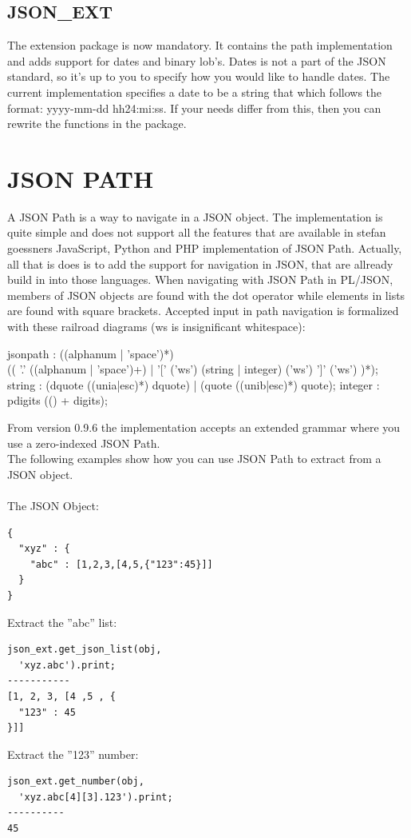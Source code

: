 \documentclass[11pt,a4paper]{article}
\begin{document}
\subsection*{JSON\_EXT}
The extension package is now mandatory. It contains the path implementation and adds support for dates and binary lob's. Dates is not a part of the JSON standard, so it's up to you to specify how you would like to handle dates. The current implementation specifies a date to be a string that which follows the format: yyyy-mm-dd hh24:mi:ss. If your needs differ from this, then you can rewrite the functions in the package.

\newpage
\section{JSON PATH}
A JSON Path is a way to navigate in a JSON object. The implementation is quite simple and does not support all the features that are available in stefan goessners JavaScript, Python and PHP implementation of JSON Path. Actually, all that is does is to add the support for navigation in JSON, that are allready build in into those languages. When navigating with JSON Path in PL/JSON, members of JSON objects are found with the dot operator while elements in lists are found with square brackets. Accepted input in path navigation is formalized with these railroad diagrams (ws is insignificant whitespace):
\begin{rail}
jsonpath : ((alphanum | 'space')*) \\(( '.' ((alphanum | 'space')+) | '[' ('ws') (string | integer) ('ws') ']' ('ws') )*);
string   : (dquote ((unia|esc)*) dquote) | (quote ((unib|esc)*) quote);
integer  : pdigits (() + digits);
\end{rail}
From version 0.9.6 the implementation accepts an extended grammar where you use a zero-indexed JSON Path.\\
The following examples show how you can use JSON Path to extract from a JSON object.\\\\
The JSON Object:
\begin{verbatim}
{
  "xyz" : {
    "abc" : [1,2,3,[4,5,{"123":45}]]
  }
}
\end{verbatim}
Extract the ''abc'' list:
\begin{verbatim}
json_ext.get_json_list(obj, 
  'xyz.abc').print;
-----------
[1, 2, 3, [4 ,5 , {
  "123" : 45
}]]
\end{verbatim}
Extract the ''123'' number:
\begin{verbatim}
json_ext.get_number(obj,
  'xyz.abc[4][3].123').print;
----------
45
\end{verbatim}
\end{document}
